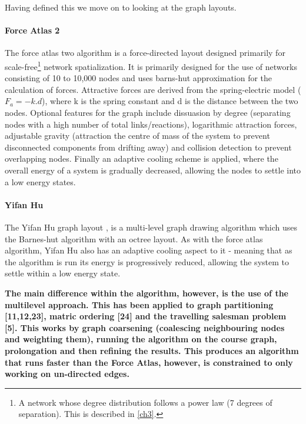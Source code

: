 Having defined this we move on to looking at the graph layouts.

\paragraph{Force Atlas 2}
The force atlas two \citep{fa} algorithm is a force-directed layout designed primarily for scale-free\footnote{A network whose degree distribution follows a power law (7 degrees of separation). This is described in \autoref{ch3}.} network spatialization. It is primarily designed for the use of networks consisting of 10 to 10,000 nodes and uses barns-hut approximation for the calculation of forces. Attractive forces are derived from the spring-electric model ($F_a = -k.d$), where k is the spring constant and d is the distance between the two nodes. Optional features for the graph include dissuasion by degree (separating nodes with a high number of total links/reactions), logarithmic attraction forces, adjustable gravity (attraction the centre of mass of the system to prevent disconnected components from drifting away) and collision detection to prevent overlapping nodes. Finally an adaptive cooling scheme is applied, where the overall energy of a system is gradually decreased, allowing the nodes to settle into a low energy states.

\paragraph{Yifan Hu}
The Yifan Hu graph layout \citep{yh}, is a multi-level graph drawing algorithm which uses the Barnes-hut algorithm with an octree layout. As with the force atlas algorithm, Yifan Hu also has an adaptive cooling aspect to it - meaning that as the algorithm is run its energy is progressively reduced, allowing the system to settle within a low energy state.  

\newpage

\textbf{The main difference within the algorithm, however, is the use of the multilevel approach. This has been applied to graph partitioning [11,12,23], matric ordering [24] and the travelling salesman problem [5]. This works by graph coarsening (coalescing neighbouring nodes and weighting them), running the algorithm on the course graph, prolongation and then refining the results. This produces an algorithm that runs faster than the Force Atlas, however, is constrained to only working on un-directed edges.
}


